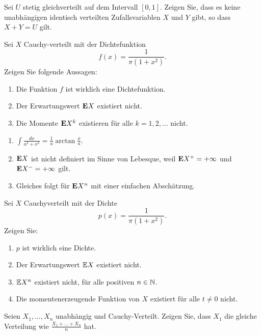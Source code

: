  Sei $U$ stetig
gleichverteilt auf dem Intervall $\left[ 0,1 \right]$. Zeigen Sie, dass
es keine unabhängigen identisch verteilten Zufallsvariablen $X$ und $Y$
gibt, so dass $X+Y=U$ gilt.


Sei $X$ Cauchy-verteilt mit der Dichtefunktion
\begin{equation*}
    f(x) = \frac{1}{\pi (1+x^2)}.
\end{equation*}
Zeigen Sie folgende Aussagen:
\begin{enumerate}
    \item Die Funktion $f$ ist wirklich eine Dichtefunktion.
    \item Der Erwartungswert $\mathbf E X$ existiert nicht.
    \item Die Momente $\mathbf E X^k$ existieren für alle $k=1,2,\dots$ nicht.
\end{enumerate}

\solution
\begin{enumerate}
    \item $\int \frac{dx}{a^2+x^2} = \frac{1}{a} \arctan \frac{x}{a}$.
    \item $\mathbf E X$ ist nicht definiert im Sinne von Lebesque, weil 
        $\mathbf E X^{+}=+\infty$ und $\mathbf E X^{-}=+\infty$ gilt. 
    \item Gleiches folgt für $\mathbf E X^{n}$ mit einer einfachen Abschätzung.
\end{enumerate}


Sei $X$ Cauchyverteilt mit der Dichte
\begin{equation*}
    p(x) = \frac{1}{\pi (1+x^2)}.
\end{equation*}
Zeigen Sie:
\begin{enumerate}
    \item $p$ ist wirklich eine Dichte.
    \item Der Erwartungswert $\mathbb{E} X$ existiert nicht.
    \item $\mathbb{E} X^n$ existiert nicht, für alle positiven $n\in \mathbb N$. 
    \item Die momentenerzeugende Funktion von $X$ existiert für alle $t \neq 0$ nicht. 
\end{enumerate}

 Seien $X_1,\dots ,X_n$
unabhängig und Cauchy-Verteilt. Zeigen Sie, dass $X_1$ die gleiche
Verteilung wie $\frac{X_1 +\dots + X_n}{n}$ hat. 





